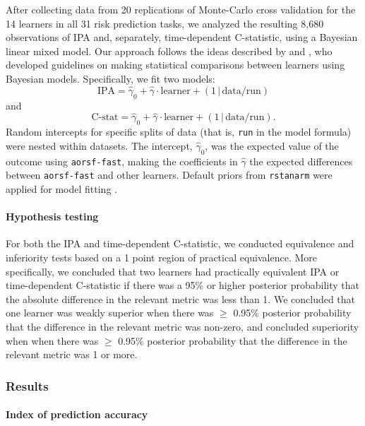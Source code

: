 \documentclass[twoside,11pt]{article}\usepackage[]{graphicx}\usepackage[]{xcolor}
\newcommand{\ie}{that is}
\begin{document}
After collecting data from 20 replications of Monte-Carlo cross validation for the 14 learners in all 31 risk prediction tasks, we analyzed the resulting 8,680 observations of IPA and, separately, time-dependent C-statistic, using a Bayesian linear mixed model. Our approach follows the ideas described by \citet{benavoli2017time} and \citet{tidymodels}, who developed guidelines on making statistical comparisons between learners using Bayesian models. Specifically, we fit two models: $$\text{IPA} = \widehat{\gamma}_0 + \widehat{\gamma} \cdot \text{learner} + (1\,|\, \text{data/run}) $$ and $$\text{C-stat} = \widehat{\gamma}_0 + \widehat{\gamma} \cdot \text{learner} + (1\,|\, \text{data/run}).$$ Random intercepts for specific splits of data (\ie, \texttt{run} in the model formula) were nested within datasets. The intercept, $\widehat{\gamma}_0$, was the expected value of the outcome using \texttt{aorsf-fast}, making the coefficients in $\widehat{\gamma}$ the expected differences between \texttt{aorsf-fast} and other learners. Default priors from \texttt{rstanarm} were applied for model fitting \citep{rstanarm}.

\paragraph{Hypothesis testing} For both the IPA and time-dependent C-statistic, we conducted equivalence and inferiority tests based on a 1 point region of practical equivalence. More specifically, we concluded that two learners had practically equivalent IPA or time-dependent C-statistic if there was a 95\% or higher posterior probability that the absolute difference in the relevant metric was less than 1. We concluded that one learner was weakly superior when there was $\geq$ 0.95\% posterior probability that the difference in the relevant metric was non-zero, and concluded superiority when when there was $\geq$ 0.95\% posterior probability that the difference in the relevant metric was 1 or more.




\subsubsection{Results} \label{sec:results_pred}

\paragraph{Index of prediction accuracy}
\end{document}
